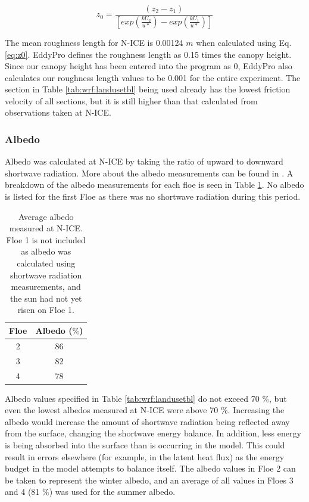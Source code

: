 \begin{equation}\label{eq:z0}
 z_{0} = \frac{(z_{2}-z_{1})}{[exp(\frac{kU_{2}}{u*}) - exp(\frac{kU_{1}}{u*})]} 
\end{equation}

The mean roughness length for N-ICE is 0.00124 $m$ when calculated using Eq. \ref{eq:z0}. EddyPro defines the roughness length as 0.15 times the canopy height. Since our canopy height has been entered into the program as 0, EddyPro also calculates our roughness length values to be 0.001 for the entire experiment. The section in Table \ref{tab:wrf:landusetbl} being used already has the lowest friction velocity of all sections, but it is still higher than that calculated from observations taken at N-ICE. 

\subsubsection{Albedo}

Albedo was calculated at N-ICE by taking the ratio of upward to downward shortwave radiation. More about the albedo measurements can be found in \citet{walden:2017}. A breakdown of the albedo measurements for each floe is seen in Table \ref{tab:albedos}. No albedo is listed for the first Floe as there was no shortwave radiation during this period. 

\begin{table}[h]
\centering
\footnotesize
\doublespacing 
{
\begin{tabular}{| c | c |}
 \hline
\rowcolor[HTML]{F3F3F3} \textbf{Floe} & \textbf{Albedo ($\%$)} \\
\hline
2 & 86 \\
3 & 82 \\
4 & 78 \\
 \hline
\end{tabular}}
\caption{Average albedo measured at N-ICE. Floe 1 is not included as albedo was calculated using shortwave radiation measurements, and the sun had not yet risen on Floe 1.}
\label{tab:albedos}
\end{table}

Albedo values specified in Table \ref{tab:wrf:landusetbl} do not exceed 70 $\%$, but even the lowest albedos measured at N-ICE were above 70 $\%$. Increasing the albedo would increase the amount of shortwave radiation being reflected away from the surface, changing the shortwave energy balance. In addition, less energy is being absorbed into the surface than is occurring in the model. This could result in errors elsewhere (for example, in the latent heat flux) as the energy budget in the model attempts to balance itself. The albedo values in Floe 2 can be taken to represent the winter albedo, and an average of all values in Floes 3 and 4 (81 $\%$) was used for the summer albedo.

